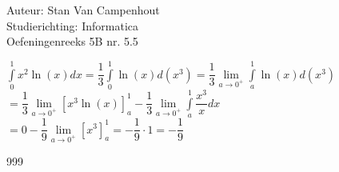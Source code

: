 \documentclass[a4paper]{article}
\begin{document}
  
\noindent \large Auteur: Stan Van Campenhout \\
\noindent \large Studierichting:  Informatica\\
\noindent \large Oefeningenreeks 5B nr. 5.5\\

\medskip

\normalsize

$ \displaystyle\int\limits_{0}^1x^2\ln(x)dx = \dfrac{1}{3}\displaystyle\int\limits_0^1\ln(x)d\left(x^3\right)
= \dfrac{1}{3}\lim\limits_{a\rightarrow0^+}\displaystyle\int\limits_a^1\ln(x)d\left(x^3\right) $\\

$ = \dfrac{1}{3}\lim\limits_{a\rightarrow0^+}\left[x^3\ln(x)\right]_a^1 - \dfrac{1}{3}\lim\limits_{a\rightarrow0^+}\displaystyle\int\limits_a^1\dfrac{x^3}{x}dx $\\

$ = 0 - \dfrac{1}{9}\lim\limits_{a\rightarrow0^+}\left[x^3\right]_a^1 = -\dfrac{1}{9}\cdot1 = -\dfrac{1}{9} $\\


\begin{thebibliography}{999}
\end{thebibliography}
\end{document}
